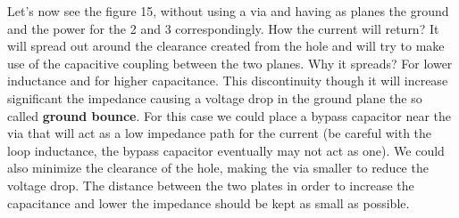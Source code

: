 \documentclass[final]{cubedoc}
\begin{document}
	Let's now see the figure 15, without using a via and having as planes the ground and the power for the 2 and 3 correspondingly. How the current will return? It will spread out around the clearance created from the hole and will try to make use of the capacitive coupling between the two planes. Why it spreads? For lower inductance and for higher capacitance. This discontinuity though it will increase significant the impedance causing a voltage drop in the ground plane the so called \textbf{ground bounce}. For this case we could place a bypass capacitor near the via that will act as a low impedance path for the current (be careful with the loop inductance, the bypass capacitor eventually may not act as one). We could also minimize the clearance of the hole, making the via smaller to reduce the voltage drop. The distance between the two plates in order to increase the capacitance and lower the impedance should be kept as small as possible.
	
\end{document}
